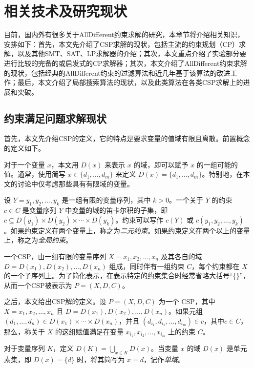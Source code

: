 \chapter{相关技术及研究现状}\label{chap:Relate}

目前，国内外有很多关于AllDifferent约束求解的研究，本章节将介绍相关知识，安排如下：首先，本文先介绍了CSP求解的现状，包括主流的约束规划（CP）求解，以及其他SMT、SAT、LP求解器的介绍；其次，本文重点介绍了实验部分要进行比较的完备的或启发式的CP求解器；其次，本文介绍了AllDifferent约束求解的现状，包括经典的AllDifferent约束的过滤算法和近几年基于该算法的改进工作；最后，本文介绍了局部搜索算法的现状，以及此类算法在各类CSP求解上的进展和突破。

\section{约束满足问题求解现状}

首先，本文先介绍CSP的定义，它的特点是要求变量的值域有限且离散。前置概念的定义如下。

对于一个变量 $x$，本文用 $D(x)$ 来表示 $x$ 的域，即可以赋予 $x$ 的一组可能的值。通常，使用简写 $x \in \{d_1, \dots, d_m\}$ 来定义 $D(x) = \{d_1, \dots, d_m\}$。特别地，在本文的讨论中仅考虑那些具有有限域的变量。

设 $Y = y_1, y_2, \dots, y_k$ 是一组有限的变量序列，其中 $k > 0$。一个关于 $Y$ 的约束 $c \in C$ 是变量序列 $Y$ 中变量的域的笛卡尔积的子集，即 $c \subseteq D(y_1) \times D(y_2) \times \cdots \times D(y_k)$。约束可以写作 $c(Y)$ 或 $c(y_1, y_2, \dots, y_k)$。如果约束定义在两个变量上，称之为\textit{二元约束}。如果约束定义在两个以上的变量上，称之为\textit{全局约束}。

\begin{definition}
    一个CSP，由一组有限的变量序列 $X = x_1, x_2, . . . , x_n$ 及其各自的域 $D = D(x_1), D(x_2), \dots, D(x_n)$ 组成，同时伴有一组约束 $C$，每个约束都在 $X$ 的一个子序列上。为了简化表示，在表示特定的约束集合时经常省略大括号“\{\}”，从而一个CSP被表示为 $P = (X, D, C)$。
\end{definition}

之后，本文给出CSP解的定义。设 $P = (X, D, C)$ 为一个 CSP，其中 $X = x_1, x_2, \dots, x_n$ 且 $D = D(x_1), D(x_2), \dots, D(x_n)$。如果元组 $(d_1, \dots, d_n) \in D(x_1) \times \cdots \times D(x_n)$，并且 $(d_{i_1}, d_{i_2}, \dots, d_{i_m}) \in c$，其中$c \in C$，那么，称关于 $X$ 的这组赋值满足在变量 $x_{i_1}, x_{i_2}, \dots, x_{i_m}$ 上的约束 $C$。

对于变量序列 $K$，定义 $D(K) = \bigcup_{x \in K} D(x)$。当变量 $x$ 的域 $D(x)$ 是单元素集，即 $D(x) = \{d\}$ 时，将其简写为 $x = d$，记作\textit{单域}。

